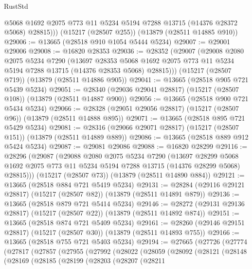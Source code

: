 \begin{lexlean}{RustStd}
\begin{coremodule}
          @5068
          @1692
          @2075
          @773
          @11
          @5234
          @5194
          @7288
          @13715
          (@14376 @28372 @5068)
          @28815)))
    (@15217 (@28507 @255))
    (@13879 (@28511 @14885 @910))
@29006 := @13665 (@28518 @910 @1054 @5444 @5234)
@29007 := @29001 @29006
@29008 := @16820 @28353
@29036 := @28352
    (@29007
      (@29008
        @2080
        @2075
        @5234
        @7290
        (@13697
          @28353
          @5068
          @1692
          @2075
          @773
          @11
          @5234
          @5194
          @7288
          @13715
          (@14376 @28353 @5068)
          @28815)))
    (@15217 (@28507 @719))
    (@13879 (@28511 @14886 @905))
@29041 := @13665 (@28518 @905 @721 @5439 @5234)
@29051 := @28340 (@29036 @29041 @28817) (@15217 (@28507 @108)) (@13879 (@28511 @14887 @900))
@29056 := @13665 (@28518 @900 @721 @5434 @5234)
@29066 := @28328 (@29051 @29056 @28817) (@15217 (@28507 @96)) (@13879 (@28511 @14888 @895))
@29071 := @13665 (@28518 @895 @721 @5429 @5234)
@29081 := @28316 (@29066 @29071 @28817) (@15217 (@28507 @151)) (@13879 (@28511 @14889 @889))
@29086 := @13665 (@28518 @889 @912 @5424 @5234)
@29087 := @29081 @29086
@29088 := @16820 @28299
@29116 := @28296
    (@29087
      (@29088
        @2080
        @2075
        @5234
        @7290
        (@13697
          @28299
          @5068
          @1692
          @2075
          @773
          @11
          @5234
          @5194
          @7288
          @13715
          (@14376 @28299 @5068)
          @28815)))
    (@15217 (@28507 @73))
    (@13879 (@28511 @14890 @884))
@29121 := @13665 (@28518 @884 @721 @5419 @5234)
@29131 := @28284 (@29116 @29121 @28817) (@15217 (@28507 @82)) (@13879 (@28511 @14891 @879))
@29136 := @13665 (@28518 @879 @721 @5414 @5234)
@29146 := @28272 (@29131 @29136 @28817) (@15217 (@28507 @22)) (@13879 (@28511 @14892 @874))
@29151 := @13665 (@28518 @874 @721 @5409 @5234)
@29161 := @28260 (@29146 @29151 @28817) (@15217 (@28507 @30)) (@13879 (@28511 @14893 @755))
@29166 := @13665 (@28518 @755 @721 @5403 @5234)
@29194 := @27665
    (@27726
      (@27774
        (@27817
          (@27857
            (@27955
              (@27992
                (@28022
                  (@28059
                    (@28092
                      (@28121
                        (@28148
                          (@28169
                            (@28185
                              (@28199
                                (@28203
                                  (@28207
                                    (@28211

\end{coremodule}
\end{lexlean}
